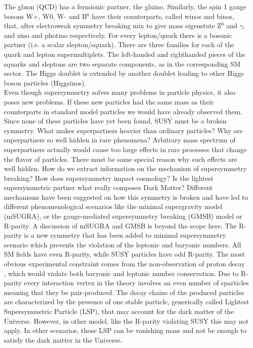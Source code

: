 The gluon (QCD) has a fermionic partner, the gluino. Similarly, the spin 1 gauge bosons W+, W0, W- and B$^0$ have their counterparts, called winos and binos, that, after electroweak symmetry breaking mix to give mass eigenstate Z$^0$ and $\gamma$, and zino and photino respectively. For every lepton/quark there is a bosonic partner (i.e. a scalar slepton/squark). There are three families for each of the quark and lepton supermultiplets. The left-handed and righthanded pieces of the squarks and sleptons are two separate components, as in the corresponding SM sector. The Higgs doublet is extended by another doublet leading to other Higgs boson particles (Higgsinos).\\

Even though supersymmetry solves many problems in particle physics, it also poses new problems. If these new particles had the same mass as their counterparts in standard model particles we would have already observed them. Since none of these particles have yet been found, SUSY must be a broken symmetry. What makes superpartners heavier than ordinary particles? Why are superpartners so well hidden in rare phenomena? Arbitrary mass spectrum of superpartners actually would cause too large effects in rare processes that change the flavor of particles. There must be some special reason why such effects are well hidden. How do we extract information on the mechanism of supersymmetry breaking? How does supersymmetry impact cosmology? Is the lightest supersymmetric partner what really composes Dark Matter? Different mechanisms have been suggested on how this symmetry is broken and have led to different phenomenological scenarios like the minimal supergravity model (mSUGRA)\cite{mSugra1,mSugra2}, or the gauge-mediated supersymmetry breaking (GMSB)\cite{GMSB1,GMSB2,GMSB3} model or R-parity\cite{Rparity1,Rparity2}. A discussion of mSUGRA and GMSB is beyond the scope here. The R-parity is a new symmetry that has been added to minimal supersymmetry scenario which prevents the violation of the leptonic and baryonic numbers. All SM fields have even R-parity, while SUSY particles have odd R-parity. The most obvious experimental constraint comes from the non-observation of proton decay \cite{pDecay1}, which would violate both baryonic and leptonic number conservation. Due to R-parity every interaction vertex in the theory involves an even number of sparticles meaning that they be pair-produced. The decay chains of the produced particles are characterized by the presence of one stable particle, generically called Lightest Supersymmetric Particle (LSP), that may account for the dark matter of the Universe. However, in other model, like the R-parity violating SUSY this may not apply. In other scenarios, those LSP can be vanishing mass and not be enough to satisfy the dark matter in the Universe.

